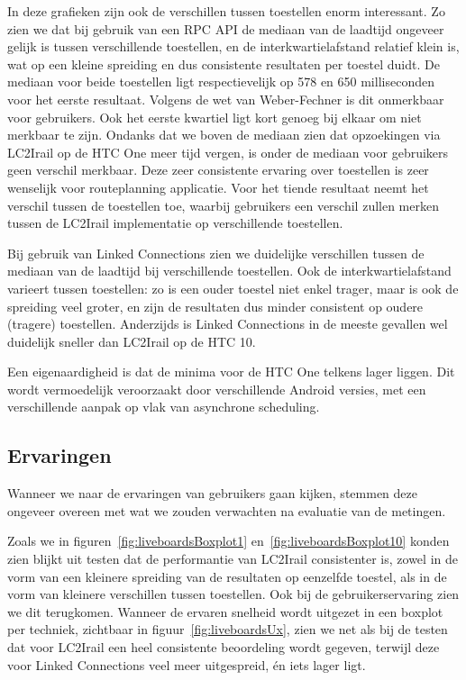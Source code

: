 In deze grafieken zijn ook de verschillen tussen toestellen enorm interessant. Zo zien we dat bij gebruik van een RPC API de mediaan van de laadtijd ongeveer gelijk is tussen verschillende toestellen, en de interkwartielafstand relatief klein is, wat op een kleine spreiding en dus consistente resultaten per toestel duidt. De mediaan voor beide toestellen ligt respectievelijk op 578 en 650 milliseconden voor het eerste resultaat. Volgens de wet van Weber-Fechner is dit onmerkbaar voor gebruikers. Ook het eerste kwartiel ligt kort genoeg bij elkaar om niet merkbaar te zijn. Ondanks dat we boven de mediaan zien dat opzoekingen via LC2Irail op de HTC One meer tijd vergen, is onder de mediaan voor gebruikers geen verschil merkbaar. Deze zeer consistente ervaring over toestellen is zeer wenselijk voor routeplanning applicatie. Voor het tiende resultaat neemt het verschil tussen de toestellen toe, waarbij gebruikers een verschil zullen merken tussen de LC2Irail implementatie op verschillende toestellen.

Bij gebruik van Linked Connections zien we duidelijke verschillen tussen de mediaan van de laadtijd bij verschillende toestellen. Ook de interkwartielafstand varieert tussen toestellen: zo is een ouder toestel niet enkel trager, maar is ook de spreiding veel groter, en zijn de resultaten dus minder consistent op oudere (tragere) toestellen. Anderzijds is Linked Connections in de meeste gevallen wel duidelijk sneller dan LC2Irail op de HTC 10.

Een eigenaardigheid is dat de minima voor de HTC One telkens lager liggen. Dit wordt vermoedelijk veroorzaakt door verschillende Android versies, met een verschillende aanpak op vlak van asynchrone scheduling.

\subsection{Ervaringen}
Wanneer we naar de ervaringen van gebruikers gaan kijken, stemmen deze ongeveer overeen met wat we zouden verwachten na evaluatie van de metingen.

Zoals we in figuren~\ref{fig:liveboardsBoxplot1} en~\ref{fig:liveboardsBoxplot10} konden zien blijkt uit testen dat de performantie van LC2Irail consistenter is, zowel in de vorm van een kleinere spreiding van de resultaten op eenzelfde toestel, als in de vorm van kleinere verschillen tussen toestellen. Ook bij de gebruikerservaring zien we dit terugkomen. Wanneer de ervaren snelheid wordt uitgezet in een boxplot per techniek, zichtbaar in figuur~\ref{fig:liveboardsUx}, zien we net als bij de testen dat voor LC2Irail een heel consistente beoordeling wordt gegeven, terwijl deze voor Linked Connections veel meer uitgespreid, én iets lager ligt.

